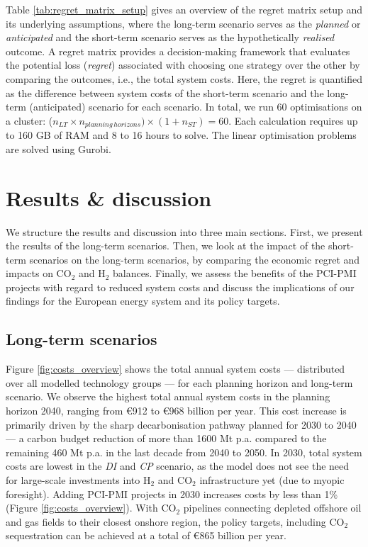 \documentclass[pdflatex,sn-nature]{sn-jnl}%
\theoremstyle{thmstyleone}%
\theoremstyle{thmstyletwo}%
\theoremstyle{thmstylethree}%
\begin{document}
Table \ref{tab:regret_matrix_setup} gives an overview of the regret matrix setup and its underlying assumptions, where the long-term scenario serves as the \textit{planned} or \textit{anticipated} and the short-term scenario serves as the hypothetically \textit{realised} outcome. A regret matrix provides a decision-making framework that evaluates the potential loss (\textit{regret}) associated with choosing one strategy over the other by comparing the outcomes, i.e., the total system costs. Here, the regret is quantified as the difference between system costs of the short-term scenario and the long-term (anticipated) scenario for each scenario. 
In total, we run 60 optimisations on a cluster: ($n_{LT} \times n_{planning\,horizons}) \times (1+n_{ST}) = 60$. Each calculation requires up to 160 GB of RAM and 8 to 16 hours to solve. The linear optimisation problems are solved using Gurobi.

\section{Results \& discussion}\label{sec:results}
We structure the results and discussion into three main sections. First, we present the results of the long-term scenarios. Then, we look at the impact of the short-term scenarios on the long-term scenarios, by comparing the economic regret and impacts on CO$_2$ and H$_2$ balances. Finally, we assess the benefits of the PCI-PMI projects with regard to reduced system costs and discuss the implications of our findings for the European energy system and its policy targets. 

\subsection{Long-term scenarios}\label{sec:long-term_scenarios}
Figure \ref{fig:costs_overview} shows the total annual system costs --- distributed over all modelled technology groups --- for each planning horizon and long-term scenario. We observe the highest total annual system costs in the planning horizon 2040, ranging from €912 to €968 billion per year. This cost increase is primarily driven by the sharp decarbonisation pathway planned for 2030 to 2040 --- a carbon budget reduction of more than 1600 Mt p.a. compared to the remaining 460 Mt p.a. in the last decade from 2040 to 2050. In 2030, total system costs are lowest in the \textit{DI} and \textit{CP} scenario, as the model does not see the need for large-scale investments into H$_2$ and CO$_2$ infrastructure yet (due to myopic foresight). Adding PCI-PMI projects in 2030 increases costs by less than 1\% (Figure \ref{fig:costs_overview}). With CO$_2$ pipelines connecting depleted offshore oil and gas fields to their closest onshore region, the policy targets, including CO$_2$ sequestration can be achieved at a total of €865 billion per year.
\end{document}
